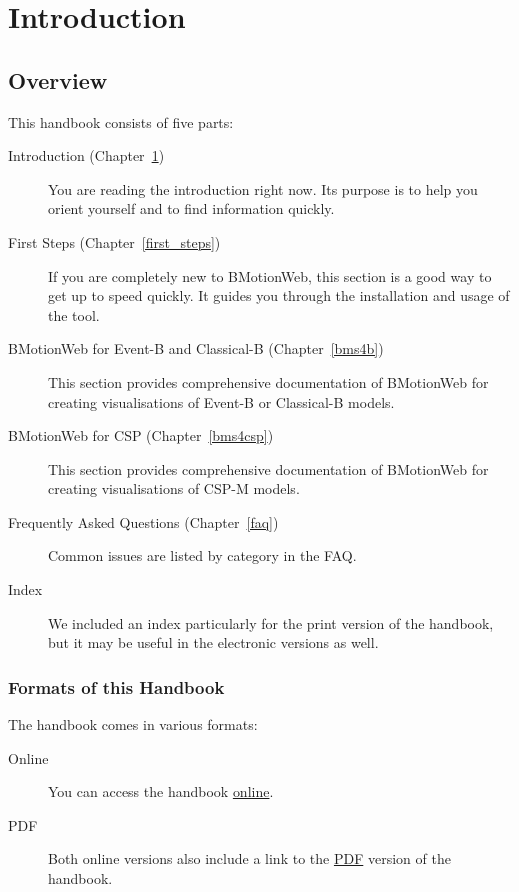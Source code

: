 \documentclass[twoside,10pt]{book}
\begin{document}
\chapter{Introduction}
\label{introduction}

\section{Overview}

This handbook consists of five parts:

\begin{description}
	\item[Introduction (Chapter~\ref{introduction})] You are reading the introduction right now.  Its purpose is to help you orient yourself and to find information quickly.
	\item[First Steps (Chapter~\ref{first_steps})] If you are completely new to BMotionWeb, this section is a good way to get up to speed quickly.
	It guides you through the installation and usage of the tool.
	\item[BMotionWeb for Event-B and Classical-B (Chapter~\ref{bms4b})] This section provides comprehensive documentation of BMotionWeb for creating visualisations of Event-B or Classical-B models.
	\item[BMotionWeb for CSP (Chapter~\ref{bms4csp})] This section provides comprehensive documentation of BMotionWeb for creating visualisations of CSP-M models.
	\item[Frequently Asked Questions  (Chapter~\ref{faq})] Common issues are listed by category in the FAQ.
	\item[Index] We included an index particularly for the print version of the handbook, but it may be useful in the electronic versions as well.
\end{description}

\subsection{Formats of this Handbook}
\label{handbook_formats}

The handbook comes in various formats:

\begin{description}
	\item[Online] You can access the handbook \href{http://nightly.cobra.cs.uni-duesseldorf.de/bmotion/bmotion-prob-handbook/nightly/html/index.html}{online}.
	\item[PDF] Both online versions also include a link to the \href{http://nightly.cobra.cs.uni-duesseldorf.de/bmotion/bmotion-prob-handbook/nightly/pdf/bms-doc.pdf}{PDF} version of the handbook.
\end{description}
\end{document}
